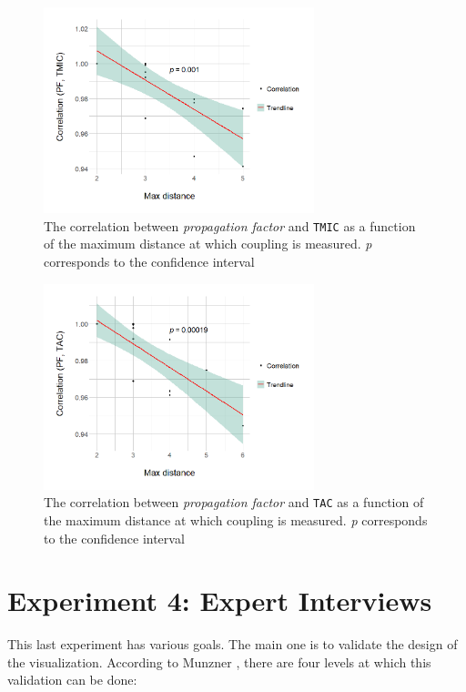 \begin{figure}[ht!]
\begin{center}
\includegraphics[width=0.7\textwidth]{figures/results/correlation_max_distance_TMIC.png}
\caption{The correlation between \textit{propagation factor} and \texttt{TMIC} as a function of the maximum distance at which coupling is measured. \textit{p} corresponds to the confidence interval}
\label{fig:cor-dist-tmic}
\end{center}
\end{figure}

\begin{figure}[ht!]
\begin{center}
\includegraphics[width=0.7\textwidth]{figures/results/correlation_max_distance_TAC.png}
\caption{The correlation between \textit{propagation factor} and \texttt{TAC} as a function of the maximum distance at which coupling is measured. \textit{p} corresponds to the confidence interval}
\label{fig:cor-dist-tac}
\end{center}
\end{figure}

\section{Experiment 4: Expert Interviews}
This last experiment has various goals. The main one is to validate the design of the visualization. According to Munzner \cite{Munzner2009}, there are four levels at which this validation can be done:

